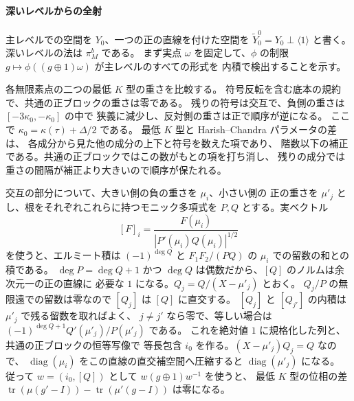 \paragraph{深いレベルからの全射}
主レベルでの空間を \(Y_0\)、一つの正の直線を付けた空間を
\(\widetilde Y_0^0=Y_0\perp\langle1\rangle\) と書く。
深いレベルの法は \(\pi_M^b\) である。
まず実点 \(\omega\) を固定して、\(\phi\) の制限
\(g\mapsto\phi((g\oplus1)\omega)\) が主レベルのすべての形式を
内積で検出することを示す。

各無限素点の二つの最低 \(K\) 型の重さを比較する。
符号反転を含む底本の規約で、共通の正ブロックの重さは零である。
残りの符号は交互で、負側の重さは \([-3\kappa_0,-\kappa_0]\) の中で
狭義に減少し、反対側の重さは正で順序が逆になる。
ここで \(\kappa_0=\kappa(\tau)+\Delta/2\) である。
最低 \(K\) 型と Harish--Chandra パラメータの差は、
各成分から見た他の成分の上下と符号を数えた項であり、
階数以下の補正である。共通の正ブロックではこの数がもとの項を打ち消し、
残りの成分では重さの間隔が補正より大きいので順序が保たれる。

交互の部分について、大きい側の負の重さを \(\mu_i\)、小さい側の
正の重さを \(\mu'_j\) とし、根をそれぞれこれらに持つモニック多項式を
\(P,Q\) とする。実ベクトル
\[
 [F]_i=\frac{F(\mu_i)}{|P'(\mu_i)Q(\mu_i)|^{1/2}}
\]
を使うと、エルミート積は \((-1)^{\deg Q}\) と
\(F_1F_2/(PQ)\) の \(\mu_i\) での留数の和との積である。
\(\deg P=\deg Q+1\) かつ \(\deg Q\) は偶数だから、\([Q]\) のノルムは余次元一の正の直線に
必要な \(1\) になる。\(Q_j=Q/(X-\mu'_j)\) とおく。
\(Q_j/P\) の無限遠での留数は零なので \([Q_j]\) は \([Q]\) に直交する。
\([Q_j]\) と \([Q_{j'}]\) の内積は \(\mu'_j\) で残る留数を取ればよく、
\(j\ne j'\) なら零で、等しい場合は
\((-1)^{\deg Q+1}Q'(\mu'_j)/P(\mu'_j)\) である。
これを絶対値 \(1\) に規格化した列と、共通の正ブロックの恒等写像で
等長包含 \(i_0\) を作る。\((X-\mu'_j)Q_j=Q\) なので、
\(\operatorname{diag}(\mu_i)\) をこの直線の直交補空間へ圧縮すると
\(\operatorname{diag}(\mu'_j)\) になる。
従って \(w=(i_0,[Q])\) として \(w(g\oplus1)w^{-1}\) を使うと、
最低 \(K\) 型の位相の差 \(\operatorname{tr}(\mu(g'-I))-
\operatorname{tr}(\mu'(g-I))\) は零になる。

